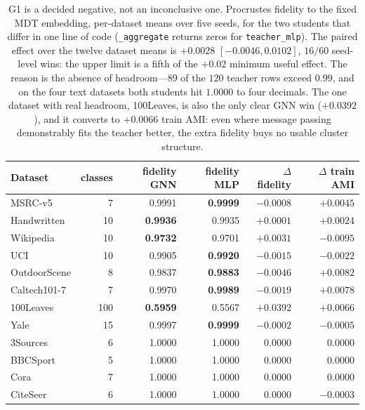 \begin{table}[t]\centering\footnotesize
\caption{G1 is a decided negative, not an inconclusive one. Procrustes fidelity to the fixed MDT
embedding, per-dataset means over five seeds, for the two students that differ in one line of code
(\texttt{\_aggregate} returns zeros for \texttt{teacher\_mlp}). The paired effect over the twelve
dataset means is $+0.0028$ $[-0.0046, 0.0102]$, $16/60$ seed-level wins: the upper limit is a fifth of
the $+0.02$ minimum useful effect. The reason is the absence of headroom---$89$ of the $120$ teacher
rows exceed $0.99$, and on the four text datasets both students hit $1.0000$ to four decimals. The one
dataset with real headroom, 100Leaves, is also the only clear GNN win ($+0.0392$), and it converts to
$+0.0066$ train AMI: even where message passing demonstrably fits the teacher better, the extra
fidelity buys no usable cluster structure.}
\label{tab:g1}
\begin{tabular}{@{}l r r r r r@{}}
\toprule
Dataset & classes & fidelity GNN & fidelity MLP & $\Delta$ fidelity & $\Delta$ train AMI\\
\midrule
MSRC-v5      & 7   & 0.9991 & \textbf{0.9999} & $-0.0008$ & $+0.0045$\\
Handwritten  & 10  & \textbf{0.9936} & 0.9935 & $+0.0001$ & $+0.0024$\\
Wikipedia    & 10  & \textbf{0.9732} & 0.9701 & $+0.0031$ & $-0.0095$\\
UCI          & 10  & 0.9905 & \textbf{0.9920} & $-0.0015$ & $-0.0022$\\
OutdoorScene & 8   & 0.9837 & \textbf{0.9883} & $-0.0046$ & $+0.0082$\\
Caltech101-7 & 7   & 0.9970 & \textbf{0.9989} & $-0.0019$ & $+0.0078$\\
100Leaves    & 100 & \textbf{0.5959} & 0.5567 & $+0.0392$ & $+0.0066$\\
Yale         & 15  & 0.9997 & \textbf{0.9999} & $-0.0002$ & $-0.0005$\\
3Sources     & 6   & 1.0000 & 1.0000 & $0.0000$ & $0.0000$\\
BBCSport     & 5   & 1.0000 & 1.0000 & $0.0000$ & $0.0000$\\
Cora         & 7   & 1.0000 & 1.0000 & $0.0000$ & $0.0000$\\
CiteSeer     & 6   & 1.0000 & 1.0000 & $0.0000$ & $-0.0003$\\

\end{tabular}
\end{table}
